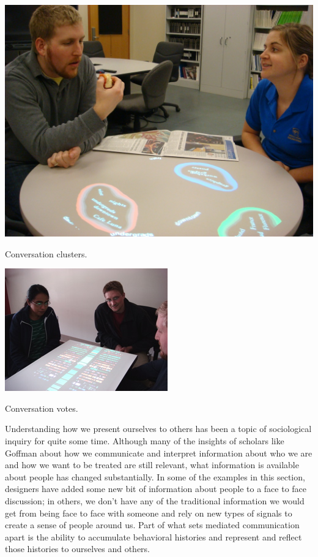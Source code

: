 \documentclass{tufte-handout}
\begin{document}
\begin{marginfigure}
	\includegraphics{figures/conversation_clusters.jpg}
	\caption{Conversation clusters.}
	\label{fig:conversation-clusters}
\end{marginfigure}

\begin{marginfigure}
	\includegraphics{figures/conversation_votes.jpg}
	\caption{Conversation votes.}
	\label{fig:conversation-votes}
\end{marginfigure}


Understanding how we present ourselves to others has been a topic of sociological inquiry for quite some time. Although many of the insights of scholars like Goffman \citep{goffman_presentation_1959} about how we communicate and interpret information about who we are and how we want to be treated are still relevant, what information is available about people has changed substantially. In some of the examples in this section, designers have added some new bit of information about people to a face to face discussion; in others, we don't have any of the traditional information we would get from being face to face with someone and rely on new types of signals to create a sense of people around us. Part of what sets mediated communication apart is the ability to accumulate behavioral histories and represent and reflect those histories to ourselves and others.
\end{document}
